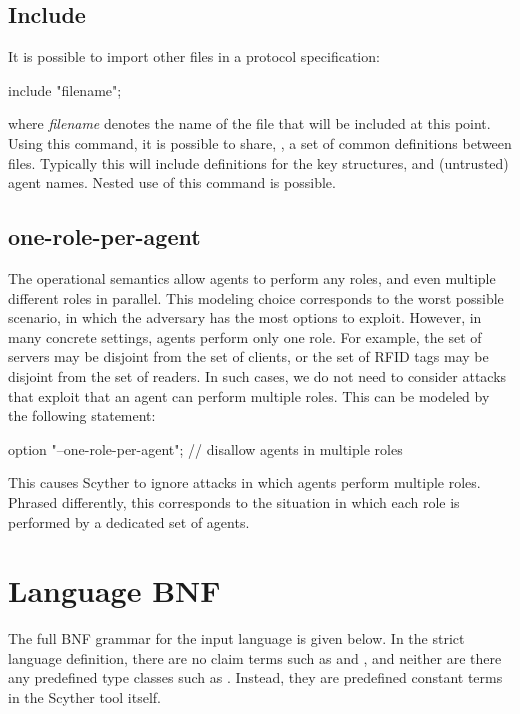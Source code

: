\documentclass{book}
\begin{document}
\subsection{Include}
It is possible to import other files in a protocol specification:

\begin{spdl}
include "filename";
\end{spdl}

where {\em filename} denotes the name of the file that will be included
at this point. Using this command, it is possible to share, \eg, a set of common
definitions between files. Typically this will include definitions for
the key structures, and (untrusted) agent names. Nested use of this
command is possible.

\subsection[one-role-per-agent]{one-role-per-agent}
The operational semantics allow agents to perform any roles, and even
multiple different roles in parallel. This modeling choice corresponds
to the worst possible scenario, in which the adversary has the most
options to exploit. However, in many concrete settings, agents perform
only one role. For example, the set of servers may be disjoint from the
set of clients, or the set of RFID tags may be disjoint from the set of
readers. In such cases, we do not need to consider attacks that exploit
that an agent can perform multiple roles. This can be modeled by the
following statement:
\begin{spdl}
option "--one-role-per-agent"; // disallow agents in multiple roles
\end{spdl}
This causes Scyther to ignore attacks in which agents perform multiple
roles. Phrased differently, this corresponds to the situation in which
each role is performed by a dedicated set of agents.

\section{Language BNF}

The full BNF grammar for the input language is given below. In the
strict language definition, there are no claim terms such as
 and , and neither are there any predefined
type classes such as . Instead, they are predefined constant
terms in the Scyther tool itself. 
\end{document}
